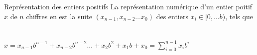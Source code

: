 
\begin{frame}{Représentation des entiers positifs}
La représentation numérique d'un entier poitif $x$ de $n$ chiffres en  est la suite 
$(x_{n-1}, x_{n-2} \ldots x_{0})$ des entiers $x_i \in [0,\ldots b)$, tels que ~\\~\\

$x=x_{n-1}b^{n-1}+x_{n-2}b^{n-2} \ldots + x_{2}b^{2}+x_{1}b+ x_{0} = \sum_{i=0}^{n-1} x_{i}b^{i} $

~\\~\\

\end{frame}


